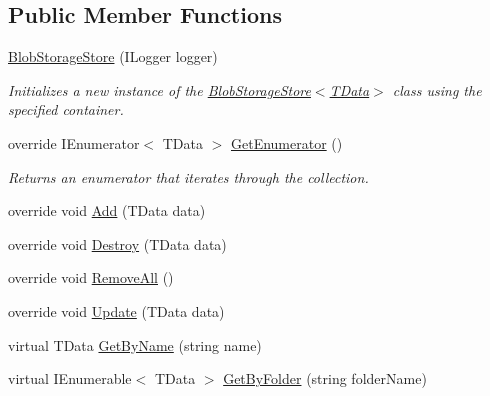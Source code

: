 \subsection*{Public Member Functions}
\begin{DoxyCompactItemize}
\item 
\hyperlink{classCqrs_1_1Azure_1_1BlobStorage_1_1BlobStorageStore_ae1979c63b97dea8e207dda7b0087ee6b}{Blob\+Storage\+Store} (I\+Logger logger)
\begin{DoxyCompactList}\small\item\em Initializes a new instance of the \hyperlink{classCqrs_1_1Azure_1_1BlobStorage_1_1BlobStorageStore_ae1979c63b97dea8e207dda7b0087ee6b}{Blob\+Storage\+Store$<$\+T\+Data$>$} class using the specified container. \end{DoxyCompactList}\item 
override I\+Enumerator$<$ T\+Data $>$ \hyperlink{classCqrs_1_1Azure_1_1BlobStorage_1_1BlobStorageStore_a7b106644bd8bfe5b1b5e5ef7bc279769}{Get\+Enumerator} ()
\begin{DoxyCompactList}\small\item\em Returns an enumerator that iterates through the collection. \end{DoxyCompactList}\item 
override void \hyperlink{classCqrs_1_1Azure_1_1BlobStorage_1_1BlobStorageStore_a527ef0e0d39f9e01f4112b6bc90129b2}{Add} (T\+Data data)
\item 
override void \hyperlink{classCqrs_1_1Azure_1_1BlobStorage_1_1BlobStorageStore_a7e4870567b393327563d131cb25151e0}{Destroy} (T\+Data data)
\item 
override void \hyperlink{classCqrs_1_1Azure_1_1BlobStorage_1_1BlobStorageStore_a4371b95250e51b8462d8ab33b6f3fe9e}{Remove\+All} ()
\item 
override void \hyperlink{classCqrs_1_1Azure_1_1BlobStorage_1_1BlobStorageStore_a03be976aded454866b4589de99a9e1c8}{Update} (T\+Data data)
\item 
virtual T\+Data \hyperlink{classCqrs_1_1Azure_1_1BlobStorage_1_1BlobStorageStore_a16464b2b12056d0d270b8657b6c9e1e6}{Get\+By\+Name} (string name)
\item 
virtual I\+Enumerable$<$ T\+Data $>$ \hyperlink{classCqrs_1_1Azure_1_1BlobStorage_1_1BlobStorageStore_a96064e01ccf12413582acd7497f3802d}{Get\+By\+Folder} (string folder\+Name)
\end{DoxyCompactItemize}
